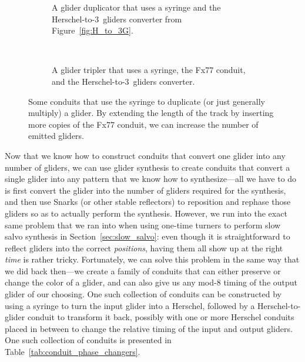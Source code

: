 \begin{figure}[!htb]
	\centering
	\begin{subfigure}{.38\textwidth}
		\centering
		\caption{A glider duplicator that uses a syringe and the Herschel-to-$3$~gliders converter from Figure~\ref{fig:H_to_3G}.}\label{fig:glider_duplicator}
	\end{subfigure} \ \ \ \ %
	\begin{subfigure}{.58\textwidth}
		\centering
		\caption{A glider tripler that uses a syringe, the Fx77 conduit, and the Herschel-to-$3$~gliders converter.}
		\label{fig:glider_tripler}
	\end{subfigure}
	\caption{Some conduits that use the syringe to duplicate (or just generally multiply) a glider. By extending the length of the track by inserting more copies of the Fx77 conduit, we can increase the number of emitted gliders.}\label{fig:glider_multipliers}
\end{figure}

Now that we know how to construct conduits that convert one glider into any number of gliders, we can use glider synthesis to create conduits that convert a single glider into any pattern that we know how to synthesize---all we have to do is first convert the glider into the number of gliders required for the synthesis, and then use Snarks (or other stable reflectors) to reposition and rephase those gliders so as to actually perform the synthesis. However, we run into the exact same problem that we ran into when using one-time turners to perform slow salvo synthesis in Section~\ref{sec:slow_salvo}: even though it is straightforward to reflect gliders into the correct \emph{positions}, having them all show up at the right \emph{time} is rather tricky. Fortunately, we can solve this problem in the same way that we did back then---we create a family of conduits that can either preserve or change the color of a glider, and can also give us any mod-$8$ timing of the output glider of our choosing. One such collection of conduits can be constructed by using a syringe to turn the input glider into a Herschel, followed by a Herschel-to-glider conduit to transform it back, possibly with one or more Herschel conduits placed in between to change the relative timing of the input and output gliders. One such collection of conduits is presented in Table~\ref{tab:conduit_phase_changers}.


